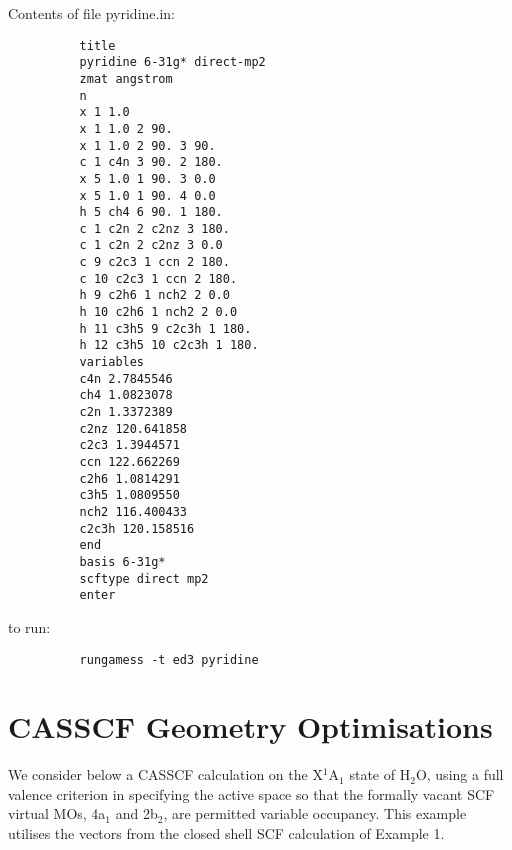 \documentclass[11pt,fleqn]{article}
\newcommand{\water}{\mbox{H$_{2}$O}}
\begin{document}
Contents of file pyridine.in:
{
\footnotesize
\begin{verbatim}
          title
          pyridine 6-31g* direct-mp2
          zmat angstrom
          n
          x 1 1.0
          x 1 1.0 2 90.
          x 1 1.0 2 90. 3 90.
          c 1 c4n 3 90. 2 180.
          x 5 1.0 1 90. 3 0.0
          x 5 1.0 1 90. 4 0.0
          h 5 ch4 6 90. 1 180.
          c 1 c2n 2 c2nz 3 180.
          c 1 c2n 2 c2nz 3 0.0
          c 9 c2c3 1 ccn 2 180.
          c 10 c2c3 1 ccn 2 180.
          h 9 c2h6 1 nch2 2 0.0
          h 10 c2h6 1 nch2 2 0.0
          h 11 c3h5 9 c2c3h 1 180.
          h 12 c3h5 10 c2c3h 1 180.
          variables
          c4n 2.7845546
          ch4 1.0823078
          c2n 1.3372389
          c2nz 120.641858
          c2c3 1.3944571
          ccn 122.662269
          c2h6 1.0814291
          c3h5 1.0809550
          nch2 116.400433
          c2c3h 120.158516
          end
          basis 6-31g*
          scftype direct mp2
          enter
\end{verbatim}
}
to run:
{
\footnotesize
\begin{verbatim}
          rungamess -t ed3 pyridine
\end{verbatim}
}

\section[CASSCF Geometry Optimisations]{CASSCF Geometry Optimisations}
We consider below a CASSCF calculation on the X$^{1}$A$_{1}$ state
of \water, using a full valence criterion in specifying the
active space so that the formally vacant SCF virtual MOs, 4a$_{1}$
and 2b$_{2}$, are permitted variable occupancy. This example
utilises the vectors from the closed shell SCF calculation of
Example 1.
\end{document}
